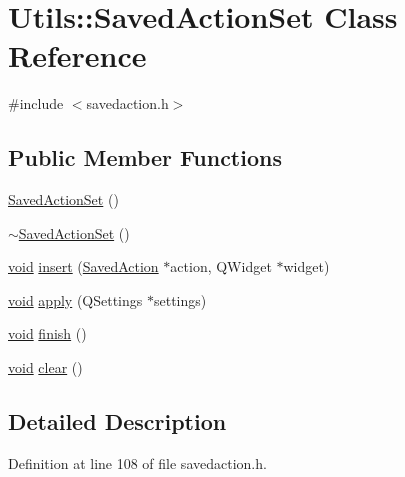 \hypertarget{class_utils_1_1_saved_action_set}{\section{\-Utils\-:\-:\-Saved\-Action\-Set \-Class \-Reference}
\label{class_utils_1_1_saved_action_set}
}


{\ttfamily \#include $<$savedaction.\-h$>$}

\subsection*{\-Public \-Member \-Functions}
\begin{DoxyCompactItemize}
\item 
\hyperlink{class_utils_1_1_saved_action_set_a756e428cacfa6568940ed41d9bd8c6d7}{\-Saved\-Action\-Set} ()
\item 
\hyperlink{class_utils_1_1_saved_action_set_a8cbd505189484f0860f3a4e902292408}{$\sim$\-Saved\-Action\-Set} ()
\item 
\hyperlink{group___u_a_v_objects_plugin_ga444cf2ff3f0ecbe028adce838d373f5c}{void} \hyperlink{class_utils_1_1_saved_action_set_a92ee9410973931c6802b39223d77722c}{insert} (\hyperlink{class_utils_1_1_saved_action}{\-Saved\-Action} $\ast$action, \-Q\-Widget $\ast$widget)
\item 
\hyperlink{group___u_a_v_objects_plugin_ga444cf2ff3f0ecbe028adce838d373f5c}{void} \hyperlink{class_utils_1_1_saved_action_set_aea445350708ef606ab74ddac03e4d690}{apply} (\-Q\-Settings $\ast$settings)
\item 
\hyperlink{group___u_a_v_objects_plugin_ga444cf2ff3f0ecbe028adce838d373f5c}{void} \hyperlink{class_utils_1_1_saved_action_set_a41af1237602ed061875f9a062785a25d}{finish} ()
\item 
\hyperlink{group___u_a_v_objects_plugin_ga444cf2ff3f0ecbe028adce838d373f5c}{void} \hyperlink{class_utils_1_1_saved_action_set_a3125297411f8e5ec231a07c6de22a6ee}{clear} ()
\end{DoxyCompactItemize}


\subsection{\-Detailed \-Description}


\-Definition at line 108 of file savedaction.\-h.



